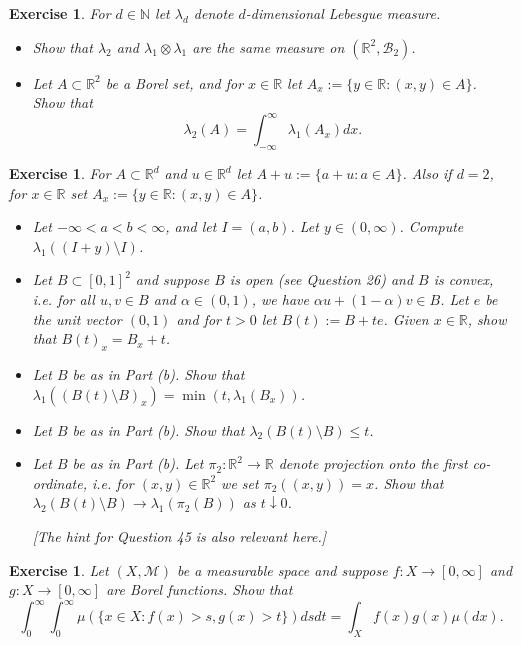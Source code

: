 \documentclass{article}
\newtheorem{exercise}[theorem]{Exercise}
\begin{document}
\begin{exercise}
For $d \in \mathbb{N}$ let $\lambda_d$ denote $d$-dimensional Lebesgue measure.
\begin{itemize}
    \item[(a)] Show that $\lambda_2$ and $\lambda_1 \otimes \lambda_1$ are the same measure on $(\mathbb{R}^2, \mathcal{B}_2)$.
    \item[(b)] Let $A \subset \mathbb{R}^2$ be a Borel set, and for $x \in \mathbb{R}$ let $A_x := \{y \in \mathbb{R} : (x, y) \in A\}$. Show that
    \[
    \lambda_2(A) = \int_{-\infty}^{\infty} \lambda_1(A_x)dx.
    \]
\end{itemize}
\end{exercise}

\begin{exercise}
For $A \subset \mathbb{R}^d$ and $u \in \mathbb{R}^d$ let $A + u := \{a + u : a \in A\}$. Also if $d = 2$, for $x \in \mathbb{R}$ set $A_x := \{y \in \mathbb{R} : (x, y) \in A\}$.
\begin{itemize}
    \item[(a)] Let $-\infty < a < b < \infty$, and let $I = (a,b)$. Let $y \in (0,\infty)$. Compute $\lambda_1((I + y) \setminus I)$.
    \item[(b)] Let $B \subset [0,1]^2$ and suppose $B$ is open (see Question 26) and $B$ is convex, i.e. for all $u,v \in B$ and $\alpha \in (0,1)$, we have $\alpha u + (1-\alpha)v \in B$. Let $e$ be the unit vector $(0,1)$ and for $t > 0$ let $B(t) := B + te$. Given $x \in \mathbb{R}$, show that $B(t)_x = B_x + t$.
    \item[(c)] Let $B$ be as in Part (b). Show that $\lambda_1((B(t) \setminus B)_x) = \min(t, \lambda_1(B_x))$.
    \item[(d)] Let $B$ be as in Part (b). Show that $\lambda_2(B(t) \setminus B) \leq t$.
    \item[(e)] Let $B$ be as in Part (b). Let $\pi_2 : \mathbb{R}^2 \to \mathbb{R}$ denote projection onto the first co-ordinate, i.e. for $(x,y) \in \mathbb{R}^2$ we set $\pi_2((x,y)) = x$. Show that $\lambda_2(B(t) \setminus B) \to \lambda_1(\pi_2(B))$ as $t \downarrow 0$.
    
    \textit{[The hint for Question 45 is also relevant here.]}
\end{itemize}
\end{exercise}

\begin{exercise}
Let $(X, \mathcal{M})$ be a measurable space and suppose $f : X \to [0,\infty]$ and $g : X \to [0,\infty]$ are Borel functions. Show that
\[
\int_{0}^{\infty} \int_{0}^{\infty} \mu(\{x \in X : f(x) > s, g(x) > t\})dsdt = \int_{X} f(x)g(x)\mu(dx).
\]
\end{exercise}
\end{document}
